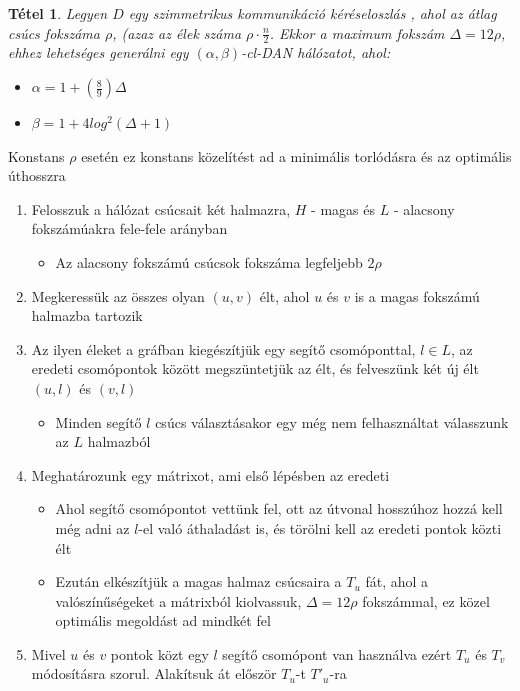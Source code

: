 \documentclass[12pt]{report}
\newtheorem{mytetel}{Tétel}
\begin{document}
\begin{mytetel}
	Legyen \(D\) egy szimmetrikus kommunikáció kéréseloszlás , ahol az átlag csúcs fokszáma \(\rho\), (azaz az élek száma \(\rho \cdot \frac{n}{2}\). Ekkor a maximum fokszám \(\Delta = 12\rho\), ehhez lehetséges generálni egy \((\alpha, \beta)\)-cl-DAN hálózatot, ahol:
	\begin{itemize}
		\item \(\alpha = 1 + (\frac{8}{9})\Delta\)
		\item \(\beta = 1 + 4log^2(\Delta + 1)\)
	\end{itemize}
\end{mytetel}
Konstans \(\rho\) esetén ez konstans közelítést ad a minimális torlódásra és az optimális úthosszra

\begin{enumerate}
	\item Felosszuk a hálózat csúcsait két halmazra, \(H\) - magas és \(L\) - alacsony fokszámúakra fele-fele arányban
	\begin{itemize}
		\item Az alacsony fokszámú csúcsok fokszáma legfeljebb \(2\rho\)
	\end{itemize}
	\item Megkeressük az összes olyan \((u, v)\) élt, ahol \(u\) és \(v\) is a magas fokszámú halmazba tartozik
	\item Az ilyen éleket a gráfban kiegészítjük egy segítő csomóponttal, \(l \in L\), az eredeti csomópontok között megszüntetjük az élt, és felveszünk két új élt \((u, l)\) és \((v, l)\)
	\begin{itemize}
		\item Minden segítő \(l\) csúcs választásakor egy még nem felhasználtat válasszunk az \(L\) halmazból
	\end{itemize}
	\item Meghatározunk egy mátrixot, ami első lépésben az eredeti
	\begin{itemize}
		\item Ahol segítő csomópontot vettünk fel, ott az útvonal hosszúhoz hozzá kell még adni az \(l\)-el való áthaladást is, és törölni kell az eredeti pontok közti élt
		\item Ezután elkészítjük a magas halmaz csúcsaira a \(T_u\) fát, ahol a valószínűségeket a mátrixból kiolvassuk, \(\Delta = 12\rho\) fokszámmal, ez közel optimális megoldást ad mindkét fel
	\end{itemize}
	\item Mivel \(u\) és \(v\) pontok közt egy \(l\) segítő csomópont van használva ezért \(T_u\) és \(T_v\) módosításra szorul. Alakítsuk át először \(T_u\)-t \(T'_u\)-ra

\end{enumerate}
\end{document}
